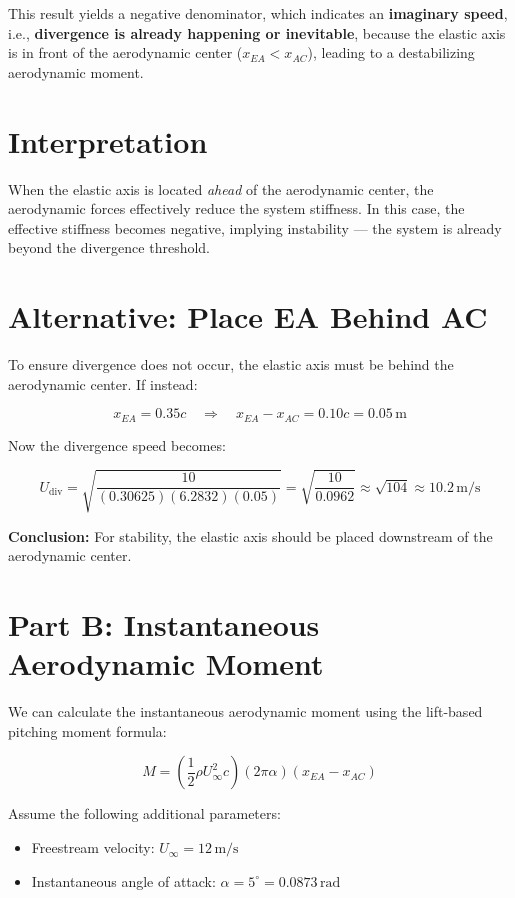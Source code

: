 \documentclass{article}
\begin{document}
This result yields a negative denominator, which indicates an \textbf{imaginary speed}, i.e., \textbf{divergence is already happening or inevitable}, because the elastic axis is in front of the aerodynamic center (\( x_{EA} < x_{AC} \)), leading to a destabilizing aerodynamic moment.

\section*{Interpretation}

When the elastic axis is located \textit{ahead} of the aerodynamic center, the aerodynamic forces effectively reduce the system stiffness. In this case, the effective stiffness becomes negative, implying instability --- the system is already beyond the divergence threshold.

\section*{Alternative: Place EA Behind AC}

To ensure divergence does not occur, the elastic axis must be behind the aerodynamic center. If instead:

\[
x_{EA} = 0.35c \quad \Rightarrow \quad x_{EA} - x_{AC} = 0.10c = 0.05 \, \text{m}
\]

Now the divergence speed becomes:

\[
U_{\text{div}} = \sqrt{ \frac{10}{(0.30625)(6.2832)(0.05)} } = \sqrt{ \frac{10}{0.0962} } \approx \sqrt{104} \approx 10.2 \, \text{m/s}
\]

\textbf{Conclusion:} For stability, the elastic axis should be placed downstream of the aerodynamic center.

\section*{Part B: Instantaneous Aerodynamic Moment}

We can calculate the instantaneous aerodynamic moment using the lift-based pitching moment formula:

\[
M = \left( \frac{1}{2} \rho U_\infty^2 c \right)(2\pi \alpha)(x_{EA} - x_{AC})
\]

Assume the following additional parameters:
\begin{itemize}
    \item Freestream velocity: \( U_\infty = 12 \, \text{m/s} \)
    \item Instantaneous angle of attack: \( \alpha = 5^\circ = 0.0873 \, \text{rad} \)
\end{itemize}
\end{document}
